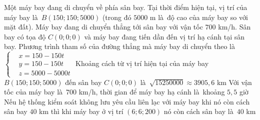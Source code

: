 \begin{ex}%
	Một máy bay đang di chuyển về phía sân bay. Tại thời điểm hiện tại, vị trí của máy bay là~$B(150;  150; 5000)$ (trong đó $5000$ m là~độ cao của máy bay so với mặt đất). Máy bay đang di chuyển thẳng tới sân bay với vận tốc $700$ km/h. Sân bay có tọa độ $C(0; 0; 0)$ và máy bay đang tiến dần đến vị trí hạ cánh tại sân bay.
	\choiceTF 
		{\True Phương trình tham số của đường thẳng mà máy bay di chuyển theo là~$\left\{\begin{aligned}&x=150-150 t \\ & y=150-150 t \\ & z=5000-5000 t
\end{aligned}\right.$}
{Khoảng cách từ vị  trí hiện tại của máy bay $B(150; 150; 5000)$ đến sân bay $C(0; 0; 0)$ là~$\sqrt{15250000} \approx 3905{,}6$ km}
{Với vận tốc của máy bay là~$700$ km/h,  thời gian để máy bay hạ cánh là~khoảng $5{,}5$ giờ}
{Nếu hệ thống kiểm soát không lưu yêu cầu liên lạc với máy bay khi nó còn cách  sân bay $40$ km thì khi máy bay ở vị trí $(6; 6; 200)$ nó còn cách sân bay là~$40$ km}
\end{ex}

